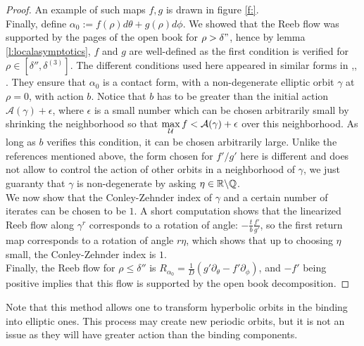 \documentclass[../main.tex]{subfiles}
\begin{document}
\begin{proof}
An example of such maps $f,g$ is drawn in figure \ref{f:}.\\
Finally, define $\alpha_0 := f(\rho)d\theta + g(\rho)d\phi$. 
We showed that the Reeb flow was supported by the pages of the open book for $\rho > \delta"$, hence by lemma \ref{l:localasymptotics}, $f$ and $g$ are well-defined as the first condition is verified for $\rho \in[\delta'',\delta^{(3)}]$. 
The different conditions used here appeared in similar forms in \cite{wendl_open_2009},\cite{roux_cas_nodate}, \cite{wendl_holomorphic_2010}. They ensure that $\alpha_0$ is a contact form, with a non-degenerate elliptic orbit $\gamma$ at $\rho = 0$, with action $b$. Notice that $b$ has to be greater than the initial action $\mathcal{A}(\gamma) + \epsilon$, where $\epsilon$ is a small number which can be chosen arbitrarily small by shrinking the neighborhood so that $\displaystyle\max_{\mathcal{U}} f < \mathcal{A}(\gamma) + \epsilon$ over this neighborhood. As long as $b$ verifies this condition, it can be chosen arbitrarily large. Unlike the references mentioned above, the form chosen for $f'/g'$ here is different and does not allow to control the action of other orbits in a neighborhood of $\gamma$, we just guaranty that $\gamma$ is non-degenerate by asking $\eta \in \mathbb{R}\backslash \mathbb{Q}$.\\
We now show that the Conley-Zehnder index of $\gamma$ and a certain number of iterates can be chosen to be $1$. A short computation shows that the linearized Reeb flow along $\gamma^r$ corresponds to a rotation of angle: $-\frac{t}{b}\frac{f'}{g'}$, so the first return map corresponds to a rotation of angle $r\eta$, which shows that up to choosing $\eta$ small, the Conley-Zehnder index is $1$. \\

 Finally, the Reeb flow for $\rho\leq \delta ''$ is $R_{\alpha_0} = \frac{1}{D}(g'\partial_\theta - f'\partial_\phi)$, and $-f'$ being positive implies that this flow is supported by the open book decomposition.



\end{proof}



\begin{remark}
Note that this method allows one to transform hyperbolic orbits in the binding into elliptic ones. This process may create new periodic orbits, but it is not an issue as they will have greater action than the binding components.
\end{remark}
\end{document}
